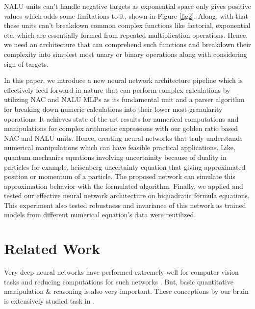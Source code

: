\documentclass[conference]{IEEEtran}
\begin{document}
NALU units can't handle negative targets as exponential space only gives positive values which adds some limitations to it, shown in Figure \ref{fig2}. Along, with that these units can't breakdown common complex functions like factorial, exponential etc. which are essentially formed from repeated multiplication operations. Hence, we need an architecture that can comprehend such functions and breakdown their complexity into simplest most unary or binary operations along with considering sign of targets.

In this paper, we introduce a new neural network architecture pipeline which is effectively feed forward in nature that can perform complex calculations by utilizing NAC and NALU MLPs as its fundamental unit and a parser algorithm for breaking down numeric calculations into their lower most granularity operations. It achieves state of the art results for numerical computations and manipulations for complex arithmetic expressions with our golden ratio based NAC and NALU units. Hence, creating neural networks that truly understands numerical manipulations which can have feasible practical applications. Like, quantum mechanics equations involving uncertainity because of duality in particles for example, heisenberg uncertainty equation that giving approximated position or momentum of a particle. The proposed network can simulate this approximation behavior with the formulated algorithm. Finally, we applied and tested our effective neural network architecture on biquadratic formula equations. This experiment also tested robustness and invariance of this network as trained models from different numerical equation's data were reutilized.



\section{Related Work}

Very deep neural networks have performed extremely well for computer vision tasks \cite{b6} and reducing computations for such networks \cite{b9}. But, basic quantitative manipulation \& reasoning is also very important. These conceptions by our brain is extensively studied task in \cite{b1, b2, b10}. 
\end{document}

